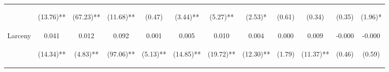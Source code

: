 \begin{tabular}{lccccccccccc}
 & \begin{footnotesize}(13.76)**\end{footnotesize} & \begin{footnotesize}(67.23)**\end{footnotesize} & \begin{footnotesize}(11.68)**\end{footnotesize} & \begin{footnotesize}(0.47)\end{footnotesize} & \begin{footnotesize}(3.44)**\end{footnotesize} & \begin{footnotesize}(5.27)**\end{footnotesize} & \begin{footnotesize}(2.53)*\end{footnotesize} & \begin{footnotesize}(0.61)\end{footnotesize} & \begin{footnotesize}(0.34)\end{footnotesize} & \begin{footnotesize}(0.35)\end{footnotesize} & \begin{footnotesize}(1.96)*\end{footnotesize}\\
\noalign{\smallskip}Larceny & 0.041 & 0.012 & 0.092 & 0.001 & 0.005 & 0.010 & 0.004 & 0.000 & 0.009 & -0.000 & -0.000\\
 & \begin{footnotesize}(14.34)**\end{footnotesize} & \begin{footnotesize}(4.83)**\end{footnotesize} & \begin{footnotesize}(97.06)**\end{footnotesize} & \begin{footnotesize}(5.13)**\end{footnotesize} & \begin{footnotesize}(14.85)**\end{footnotesize} & \begin{footnotesize}(19.72)**\end{footnotesize} & \begin{footnotesize}(12.30)**\end{footnotesize} & \begin{footnotesize}(1.79)\end{footnotesize} & \begin{footnotesize}(11.37)**\end{footnotesize} & \begin{footnotesize}(0.46)\end{footnotesize} & \begin{footnotesize}(0.59)\end{footnotesize}\\

\end{tabular}
